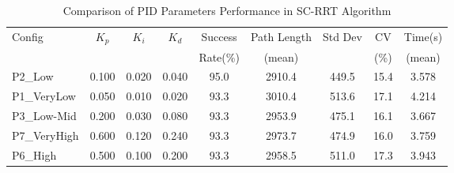
\begin{table}[htbp]
\centering
\caption{Comparison of PID Parameters Performance in SC-RRT Algorithm}
\label{tab:pid_comparison}
\begin{tabular}{lcccccccc}
\hline
Config & $K_p$ & $K_i$ & $K_d$ & Success & Path Length & Std Dev & CV & Time(s) \\
 & & & & Rate(\%) & (mean) & & (\%) & (mean) \\
\hline
P2\_Low & 0.100 & 0.020 & 0.040 & 95.0 & 2910.4 & 449.5 & 15.4 & 3.578 \\
P1\_VeryLow & 0.050 & 0.010 & 0.020 & 93.3 & 3010.4 & 513.6 & 17.1 & 4.214 \\
P3\_Low-Mid & 0.200 & 0.030 & 0.080 & 93.3 & 2953.9 & 475.1 & 16.1 & 3.667 \\
P7\_VeryHigh & 0.600 & 0.120 & 0.240 & 93.3 & 2973.7 & 474.9 & 16.0 & 3.759 \\
P6\_High & 0.500 & 0.100 & 0.200 & 93.3 & 2958.5 & 511.0 & 17.3 & 3.943 \\
\hline
\end{tabular}
\end{table}

